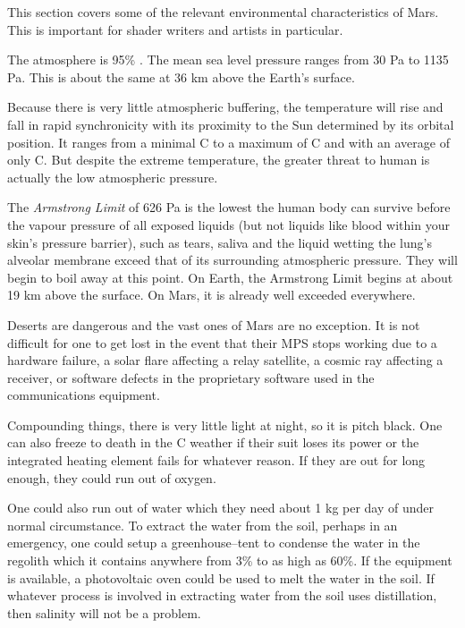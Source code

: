 

This section covers some of the relevant environmental characteristics of Mars. This is important for shader writers and artists in particular.

The atmosphere is 95\% . The mean sea level pressure ranges from 30 Pa to 1135 Pa. This is about the same at 36 km above the Earth's surface. 

Because there is very little atmospheric buffering, the temperature will rise and fall in rapid synchronicity with its proximity to the Sun determined by its orbital position. It ranges from a minimal C to a maximum of C and with an average of only C. But despite the extreme temperature, the greater threat to human is actually the low atmospheric pressure. 

The {\it Armstrong Limit} of 626 Pa is the lowest the human body can survive before the vapour pressure of all exposed liquids (but not liquids like blood within your skin's pressure barrier), such as tears, saliva and the liquid wetting the lung's alveolar membrane exceed that of its surrounding atmospheric pressure. They will begin to boil away at this point. On Earth, the Armstrong Limit begins at about 19 km above the surface. On Mars, it is already well exceeded everywhere.

Deserts are dangerous and the vast ones of Mars are no exception. It is not difficult for one to get lost in the event that their MPS stops working due to a hardware failure, a solar flare affecting a relay satellite, a cosmic ray affecting a receiver, or software defects in the proprietary software used in the communications equipment.

Compounding things, there is very little light at night, so it is pitch black. One can also freeze to death in the C weather if their suit loses its power or the integrated heating element fails for whatever reason. If they are out for long enough, they could run out of oxygen.

One could also run out of water which they need about 1 kg per day of under normal circumstance. To extract the water from the soil, perhaps in an emergency, one could setup a greenhouse--tent to condense the water in the regolith which it contains anywhere from 3\% to as high as 60\%. If the equipment is available, a photovoltaic oven could be used to melt the water in the soil. If whatever process is involved in extracting water from the soil uses distillation, then salinity will not be a problem.

